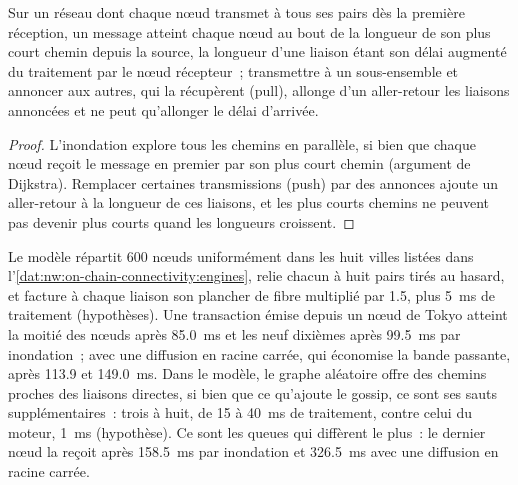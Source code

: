\begin{proposition}\label{prop:nw:on-chain-connectivity:gossip}
Sur un réseau dont chaque nœud transmet à tous ses pairs dès la première réception, un message atteint chaque nœud au bout de la longueur de son plus court chemin
depuis la source, la longueur d'une liaison étant son délai augmenté du traitement par le nœud récepteur~; transmettre à un sous-ensemble et annoncer aux autres, qui
la récupèrent (pull), allonge d'un aller-retour les liaisons annoncées et ne peut qu'allonger le délai d'arrivée.
\end{proposition}

\begin{proof}
L'inondation explore tous les chemins en parallèle, si bien que chaque nœud reçoit le message en premier par son plus court chemin (argument de Dijkstra). Remplacer certaines
transmissions (push) par des annonces ajoute un aller-retour à la longueur de ces liaisons, et les plus courts chemins ne peuvent pas devenir plus courts quand les longueurs croissent.
\end{proof}

\label{lst:nw:on-chain-connectivity:spread}

Le modèle répartit 600 nœuds uniformément dans les huit villes listées dans l'\cref{dat:nw:on-chain-connectivity:engines}, relie chacun à huit pairs tirés au hasard, et
facture à chaque liaison son plancher de fibre multiplié par 1.5, plus \qty{5}{\milli\second} de traitement (hypothèses). Une transaction émise depuis un nœud de Tokyo atteint
la moitié des nœuds après \qty{85.0}{\milli\second} et les neuf dixièmes après \qty{99.5}{\milli\second} par inondation~; avec une diffusion en racine carrée, qui
économise la bande passante, après 113.9 et \qty{149.0}{\milli\second}. Dans le modèle, le graphe aléatoire offre des chemins proches des liaisons directes,
si bien que ce qu'ajoute le gossip, ce sont ses sauts supplémentaires~: trois à huit, de 15 à \qty{40}{\milli\second} de traitement, contre celui du moteur,
\qty{1}{\milli\second} (hypothèse). Ce sont les queues qui diffèrent le plus~: le dernier nœud la reçoit après \qty{158.5}{\milli\second} par inondation et
\qty{326.5}{\milli\second} avec une diffusion en racine carrée.

